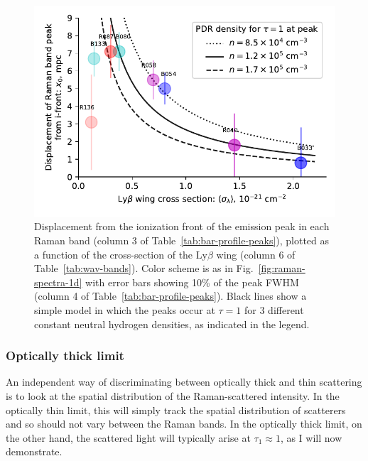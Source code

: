 \documentclass[useAMS, usenatbib, a4paper]{mnras}
\newcommand\lyb{\ensuremath{\text{Ly}\beta}}
\begin{document}
\begin{figure}
  \includegraphics[width=\linewidth]{figs/raman-band-displacements-plot}
  \caption{Displacement from the ionization front of the emission peak
    in each Raman band (column 3 of
    Table~\ref{tab:bar-profile-peaks}), plotted as a function of the
    cross-section of the \lyb{} wing (column 6 of
    Table~\ref{tab:wav-bands}).  Color scheme is as in
    Fig.~\ref{fig:raman-spectra-1d} with error bars showing 10\% of
    the peak FWHM (column 4 of Table~\ref{tab:bar-profile-peaks}).
    Black lines show a simple model in which the peaks occur at
    \(\tau = 1\) for 3 different constant neutral hydrogen densities, as
    indicated in the legend. }
  \label{fig:raman-band-displacements}
\end{figure}


\subsubsection{Optically thick limit}
\label{sec:optic-thick-limit}

An independent way of discriminating between optically thick and thin scattering
is to look at the spatial distribution of the Raman-scattered intensity.
In the optically thin limit, this will simply track the spatial distribution of scatterers
and so should not vary between the Raman bands.
In the optically thick limit, on the other hand, the scattered light will typically
arise at \(\tau_1 \approx 1\), as I will now demonstrate.
\end{document}
